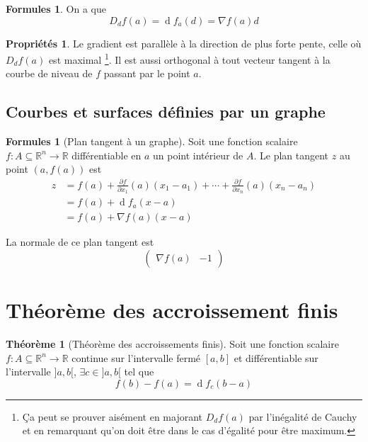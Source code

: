 \documentclass[11pt,a4paper]{article}
\theoremstyle{definition}
\newtheorem{myprop}[mydef]{Propriétés}
\newtheorem{myform}[mydef]{Formules}
\newtheorem{mytheo}[mydef]{Théorème}
\DeclareMathOperator{\diff}{d}
\newcommand{\dif}{\diff\!}
\newcommand{\pa}{\partial}
\newcommand{\R}{\mathbb{R}}
\begin{document}
\begin{myform} On a que
	\[ D_df(a) = \dif f_a(d) = \nabla f(a) d \]
\end{myform}

\begin{myprop} Le gradient est parallèle à la direction de plus forte pente,
	celle où $D_df(a)$ est maximal
	\footnote{\c{C}a peut se prouver aisément en majorant $D_df(a)$ par l'inégalité de Cauchy et en remarquant qu'on doit être dans le cas d'égalité pour être maximum.}.
	Il est aussi orthogonal à tout vecteur tangent à la courbe de niveau de $f$ passant par le point $a$.
\end{myprop}

\subsection{Courbes et surfaces définies par un graphe}

\begin{myform}[Plan tangent à un graphe]
	Soit une fonction scalaire $f : A \subseteq \R^n \to \R$ différentiable en $a$ un point intérieur de $A$. Le plan tangent $z$ au point $(a,f(a))$ est
	\begin{align*}
		z & = f(a) + \frac{\pa f}{\pa x_1}(a)(x_1 - a_1) + \cdots + \frac{\pa f}{\pa x_n}(a) (x_n - a_n) \\
		& = f(a) + \dif f_a(x-a) \\
		& = f(a) + \nabla f(a)(x-a)
	\end{align*}

	La normale de ce plan tangent est
	\[
	\begin{pmatrix}
		\nabla f(a) & -1
	\end{pmatrix}
	\]
\end{myform}


\section{Théorème des accroissement finis}

\begin{mytheo}[Théorème des accroissements finis] Soit une fonction scalaire $f : A \subseteq \R^n \to \R$ continue sur l'intervalle fermé $[a,b]$ et différentiable sur l'intervalle $]a,b[$, $\exists c \in ]a,b[$ tel que
	\[ f(b) - f(a) = \dif f_c(b-a) \]
\end{mytheo}
\end{document}
